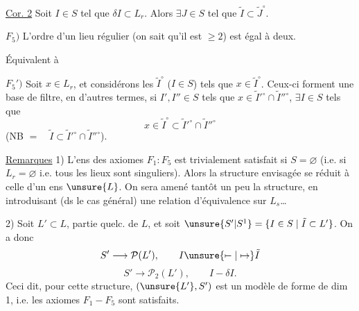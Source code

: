 \uline{Cor. 2} Soit $I\in S$ tel que $\delta I\subset L_r$.
Alors $\exists J\in S$ tel que $\tilde I\subset\tilde J^\circ$.

$F_5)$ L'ordre d'un lieu régulier (on sait qu'il est $\geq2$) est égal à deux.

Équivalent à

$F_5')$ Soit $x\in L_r$, et considérons les $\tilde I^\circ$ ($I\in S$) tels que $x\in\tilde I^\circ$.
Ceux-ci forment une base de filtre, en d'autres termes, si $I',I''\in S$ tels que $x\in\tilde I'^\circ\cap\tilde I''^\circ$, $\exists I\in S$ tels que
\[
x\in\tilde I^\circ\subset\tilde I'^\circ\cap\tilde I''^\circ
\]
(NB  $=\quad\tilde I\subset\tilde I'^\circ\cap\tilde I''^\circ$).




\uline{Remarques} 1) L'ens des axiomes $F_1:F_5$ est trivialement satisfait si $S=\varnothing$ (i.e. si $L_r=\varnothing$ i.e. tous les lieux sont singuliers).
Alors la structure envisagée se réduit à celle d'un ens $\unsure{L}$.
On sera amené tantôt  un peu la structure, en introduisant (ds le cas général) une relation d'équivalence sur $L_s$\ldots

2) Soit $L'\subset L$, partie quelc. de $L$, et soit $\unsure{S'|S^1}=\{I\in S\mid\tilde I\subset L'\}$. On a donc
\[
S'\longrightarrow\mathcal P(L'),\qquad I\unsure{\mapstochar\relbar|\mapsto}\tilde I
\]
\[
S'\longrightarrow\mathcal P_2(L'),\qquad I-\delta I.
\]
Ceci dit, pour cette structure, $(\unsure{L'},S')$ est un modèle de forme de dim 1, i.e. les axiomes $F_1-F_5$ sont satisfaits.

